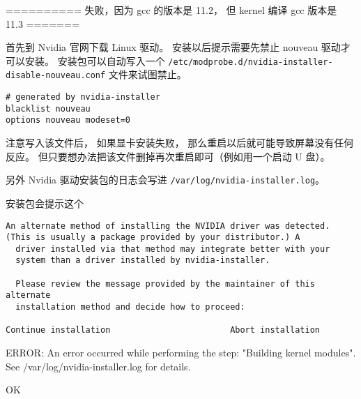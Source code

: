 ========== 失败，因为 gcc 的版本是 11.2， 但 kernel 编译 gcc 版本是 11.3 =======

首先到 Nvidia 官网下载 Linux 驱动。 安装以后提示需要先禁止 nouveau 驱动才可以安装。 安装包可以自动写入一个 \verb`/etc/modprobe.d/nvidia-installer-disable-nouveau.conf` 文件来试图禁止。
\begin{lstlisting}[language=none,caption=nvidia-installer-disable-nouveau.conf]
# generated by nvidia-installer
blacklist nouveau
options nouveau modeset=0
\end{lstlisting}

注意写入该文件后， 如果显卡安装失败， 那么重启以后就可能导致屏幕没有任何反应。 但只要想办法把该文件删掉再次重启即可（例如用一个启动 U 盘）。

另外 Nvidia 驱动安装包的日志会写进 \verb`/var/log/nvidia-installer.log`。

安装包会提示这个
\begin{lstlisting}[language=none]
An alternate method of installing the NVIDIA driver was detected.
(This is usually a package provided by your distributor.) A      
  driver installed via that method may integrate better with your
  system than a driver installed by nvidia-installer.

  Please review the message provided by the maintainer of this alternate
  installation method and decide how to proceed:

Continue installation                        Abort installation 
\end{lstlisting}

ERROR: An error occurred while performing the step: "Building kernel modules". See /var/log/nvidia-installer.log for details.      
        
                                                                  OK 

